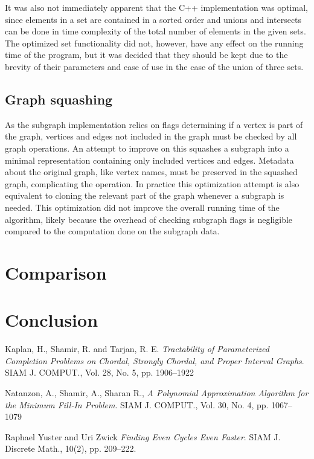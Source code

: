 \documentclass{article}
\begin{document}
		It was also not immediately apparent that the C++ implementation was optimal, since elements in a set are contained in a sorted order and unions and intersects can be done in time complexity of the total number of elements in the given sets.
		The optimized set functionality did not, however, have any effect on the running time of the program, but it was decided that they should be kept due to the brevity of their parameters and ease of use in the case of the union of three sets.
		
		\subsection{Graph squashing}
		As the subgraph implementation relies on flags determining if a vertex is part of the graph, vertices and edges not included in the graph must be checked by all graph operations.
		An attempt to improve on this squashes a subgraph into a minimal representation containing only included vertices and edges.
		Metadata about the original graph, like vertex names, must be preserved in the squashed graph, complicating the operation.
		In practice this optimization attempt is also equivalent to cloning the relevant part of the graph whenever a subgraph is needed. This optimization did not improve the overall running time of the algorithm, likely because the overhead of checking subgraph flags is negligible compared to the computation done on the subgraph data.

	\section{Comparison}

	\section{Conclusion}

	\pagebreak
	
	\begin{thebibliography}{99}

		Kaplan, H., Shamir, R. and Tarjan, R. E. 
		\textit{Tractability of Parameterized Completion Problems on Chordal, Strongly Chordal, and Proper Interval Graphs}. 
		SIAM J. COMPUT., Vol. 28, No. 5, pp. 1906--1922

		Natanzon, A., Shamir, A., Sharan R.,
		\textit{A Polynomial Approximation Algorithm for the Minimum Fill-In Problem}. 
 		SIAM J. COMPUT., Vol. 30, No. 4, pp. 1067--1079

		Raphael Yuster and Uri Zwick
		\textit{Finding Even Cycles Even Faster}.
		SIAM J. Discrete Math., 10(2), pp. 209--222.
		
	\end{thebibliography}

	\clearpage
\end{document}
